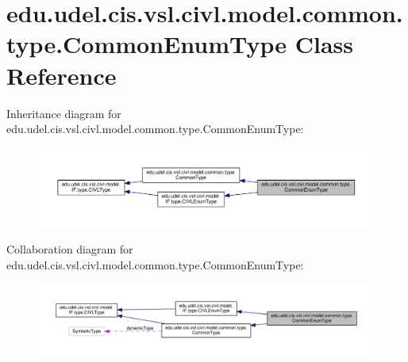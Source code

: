 \hypertarget{classedu_1_1udel_1_1cis_1_1vsl_1_1civl_1_1model_1_1common_1_1type_1_1CommonEnumType}{}\section{edu.\+udel.\+cis.\+vsl.\+civl.\+model.\+common.\+type.\+Common\+Enum\+Type Class Reference}
\label{classedu_1_1udel_1_1cis_1_1vsl_1_1civl_1_1model_1_1common_1_1type_1_1CommonEnumType}


Inheritance diagram for edu.\+udel.\+cis.\+vsl.\+civl.\+model.\+common.\+type.\+Common\+Enum\+Type\+:
\nopagebreak
\begin{figure}[H]
\begin{center}
\leavevmode
\includegraphics[width=350pt]{classedu_1_1udel_1_1cis_1_1vsl_1_1civl_1_1model_1_1common_1_1type_1_1CommonEnumType__inherit__graph}
\end{center}
\end{figure}


Collaboration diagram for edu.\+udel.\+cis.\+vsl.\+civl.\+model.\+common.\+type.\+Common\+Enum\+Type\+:
\nopagebreak
\begin{figure}[H]
\begin{center}
\leavevmode
\includegraphics[width=350pt]{classedu_1_1udel_1_1cis_1_1vsl_1_1civl_1_1model_1_1common_1_1type_1_1CommonEnumType__coll__graph}
\end{center}
\end{figure}
